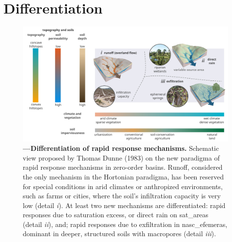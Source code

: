 \documentclass[./main_en.tex]{subfiles}
\begin{document}
\section{Differentiation}

\begin{figure}[t!] 
\centering				
\includegraphics[width=0.98\linewidth]{figs/fig_processes_en.jpg}		
\caption[Differentiation of rapid response mechanisms.]
{\textbf{---\;Differentiation of rapid response mechanisms.}
    Schematic view proposed by Thomas Dunne (1983) \cite{Dunne1983} on the new \gls{paradigma} of rapid response mechanisms in zero-order basins. Runoff, considered the only mechanism in the Hortonian \gls{paradigma}, has been reserved for special conditions in arid climates or anthropized environments, such as farms or cities, where the soil’s infiltration capacity is very low (detail \textrm{\textit{i}}). At least two new mechanisms are differentiated: rapid responses due to saturation excess, or direct rain on \gls{sat_areas} (detail \textrm{\textit{ii}}), and; rapid responses due to exfiltration in \gls{nasc_efemeras}, dominant in deeper, structured soils with macropores (detail \textrm{\textit{iii}}).
}
\label{fig:hydro:diff} 		
\end{figure}
\end{document}
